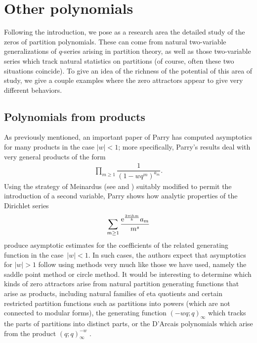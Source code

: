 \documentclass[pdftex]{sigma}
\numberwithin{equation}{section}
\def\lp{\left(}
\def\rp{\right)}
\begin{document}
\section{Other polynomials} \label{S: Conjectures}

Following the introduction, we pose as a research area the detailed study of the zeros of partition polynomials. These can come from natural two-variable generalizations of $q$-series arising in partition theory, as well as those two-variable series which track natural statistics on partitions (of course, often these two situations coincide). To give an idea of the richness of the potential of this area of study, we give a couple examples where the zero attractors appear to give very different behaviors.

\subsection{Polynomials from products}

As previously mentioned, an important paper of Parry \cite{Parry} has computed asymptotics for many products in the case $|w|<1$; more specifically, Parry's results deal with very general products of the form
\begin{align*}
 \prod_{m \geq 1} \dfrac{1}{\lp 1 - w q^m \rp^{a_m}}.
\end{align*}
Using the strategy of Meinardus (see \cite[Section 6]{Andrews} and \cite{Meinardus}) suitably modified to permit the introduction of a second variable, Parry shows how analytic properties of the Dirichlet series
\begin{align*}
 \sum_{m \geq 1} \dfrac{{\rm e}^{\frac{2\pi {\rm i} h m}{k}} a_m}{m^s}
\end{align*}
produce asymptotic estimates for the coefficients of the related generating function in the case~${|w|<1}$. In such cases, the authors expect that asymptotics for $|w|>1$ follow using methods very much like those we have used, namely the saddle point method or circle method. It would be interesting to determine which kinds of zero attractors arise from natural partition generating functions that arise as products, including natural families of eta quotients and certain restricted partition functions such as partitions into powers (which are not connected to modular forms), the generating function $\lp -wq;q \rp_\infty$ which tracks the parts of partitions into distinct parts, or the D'Arcais polynomials which arise from the product $(q;q)_{\infty}^{-w}$ \cite{Han,HN19,HN21,HN23,HNW18,Kostant}.
\end{document}

